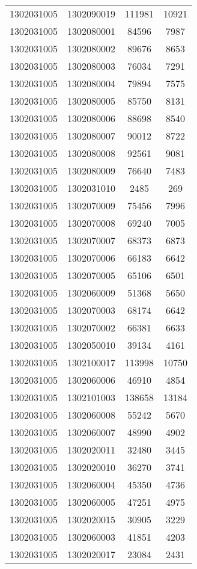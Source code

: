 \begin{longtable}[h]{llcc}
		1302031005 & 1302090019 & 111981 & 10921\\
		1302031005 & 1302080001 & 84596 & 7987\\
		1302031005 & 1302080002 & 89676 & 8653\\
		1302031005 & 1302080003 & 76034 & 7291\\
		1302031005 & 1302080004 & 79894 & 7575\\
		1302031005 & 1302080005 & 85750 & 8131\\
		1302031005 & 1302080006 & 88698 & 8540\\
		1302031005 & 1302080007 & 90012 & 8722\\
		1302031005 & 1302080008 & 92561 & 9081\\
		1302031005 & 1302080009 & 76640 & 7483\\
		1302031005 & 1302031010 & 2485 & 269\\
		1302031005 & 1302070009 & 75456 & 7996\\
		1302031005 & 1302070008 & 69240 & 7005\\
		1302031005 & 1302070007 & 68373 & 6873\\
		1302031005 & 1302070006 & 66183 & 6642\\
		1302031005 & 1302070005 & 65106 & 6501\\
		1302031005 & 1302060009 & 51368 & 5650\\
		1302031005 & 1302070003 & 68174 & 6642\\
		1302031005 & 1302070002 & 66381 & 6633\\
		1302031005 & 1302050010 & 39134 & 4161\\
		1302031005 & 1302100017 & 113998 & 10750\\
		1302031005 & 1302060006 & 46910 & 4854\\
		1302031005 & 1302101003 & 138658 & 13184\\
		1302031005 & 1302060008 & 55242 & 5670\\
		1302031005 & 1302060007 & 48990 & 4902\\
		1302031005 & 1302020011 & 32480 & 3445\\
		1302031005 & 1302020010 & 36270 & 3741\\
		1302031005 & 1302060004 & 45350 & 4736\\
		1302031005 & 1302060005 & 47251 & 4975\\
		1302031005 & 1302020015 & 30905 & 3229\\
		1302031005 & 1302060003 & 41851 & 4203\\
		1302031005 & 1302020017 & 23084 & 2431\\

\end{longtable}
